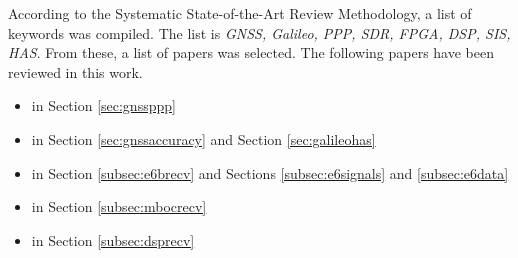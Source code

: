 According to the Systematic State-of-the-Art Review Methodology, a list of keywords was compiled. The list is \emph{GNSS, Galileo, PPP, SDR, FPGA, DSP, SIS, HAS}. From these, a list of papers was selected. The following papers have been reviewed in this work.

\begin{itemize}
    \item \cite{instantPPP} in Section \ref{sec:gnssppp}
    \item \cite{galileoHasPolicy} in Section \ref{sec:gnssaccuracy} and Section \ref{sec:galileohas}
    \item \cite{e6breceiver} in Section \ref{subsec:e6brecv} and Sections \ref{subsec:e6signals} and \ref{subsec:e6data}
    \item \cite{refstationreceiver} in Section \ref{subsec:mbocrecv}
    \item \cite{dspreceiver} in Section \ref{subsec:dsprecv}
\end{itemize}